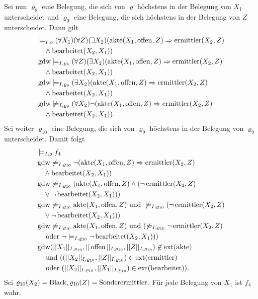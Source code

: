 \documentclass[12pt,a4paper]{amsart}
\begin{document}
Sei nun $\varrho_8$ eine Belegung, die sich von $\varrho$ höchstens in der Belegung von $X_1$ unterscheidet und $\varrho_9$ eine Belegung, die sich höchstens
in der Belegung von $Z$ unterscheidet. Dann gilt
\begin{align*}
&\models_{I,\varrho} (\forall X_1)(\forall Z)(\exists X_2)(\operatorname{akte}(X_1,\operatorname{offen},Z)\Rightarrow\operatorname{ermittler}(X_2,Z)\\
&\quad \land\operatorname{bearbeitet}(X_2,X_1)) \\
&\operatorname{gdw} \models_{I,\varrho_8} (\forall Z)(\exists X_2)(\operatorname{akte}(X_1,\operatorname{offen},Z)\Rightarrow\operatorname{ermittler}(X_2,Z)\\
&\quad\land\operatorname{bearbeitet}(X_2,X_1)) \\
&\operatorname{gdw} \models_{I,\varrho_9} (\exists X_2)(\operatorname{akte}(X_1,\operatorname{offen},Z)\Rightarrow\operatorname{ermittler}(X_2,Z)\\
&\quad\land\operatorname{bearbeitet}(X_2,X_1)) \\
&\operatorname{gdw} \not \models_{I,\varrho_9} (\forall X_2)\lnot (\operatorname{akte}(X_1,\operatorname{offen},Z)\Rightarrow\operatorname{ermittler}(X_2,Z)\\
&\quad\land\operatorname{bearbeitet}(X_2,X_1)).
\end{align*}
Sei weiter $\varrho_{10}$ eine Belegung, die sich von $\varrho_9$ höchstens in der Belegung von $\varrho_9$ unterscheidet. Damit folgt
\begin{align*}
&\models_{I,\varrho} f_4\\
&\operatorname{gdw} \not \models_{I,\varrho_{10}} \lnot (\operatorname{akte}(X_1,\operatorname{offen},Z)\Rightarrow\operatorname{ermittler}(X_2,Z)\\
&\quad\land\operatorname{bearbeitet}(X_2,X_1))\\
&\operatorname{gdw} \not \models_{I,\varrho_{10}} (\operatorname{akte}(X_1,\operatorname{offen},Z)\land(\lnot \operatorname{ermittler}(X_2,Z)\\
&\quad\lor\lnot\operatorname{bearbeitet}(X_2,X_1)))\\
&\operatorname{gdw} \not \models_{I,\varrho_{10}} \operatorname{akte}(X_1,\operatorname{offen},Z)\mbox{ und }\not \models_{I,\varrho_{10}}(\lnot \operatorname{ermittler}(X_2,Z)\\
&\quad\lor\lnot\operatorname{bearbeitet}(X_2,X_1)))\\
&\operatorname{gdw} \not \models_{I,\varrho_{10}} \operatorname{akte}(X_1,\operatorname{offen},Z)\mbox{ und }(\not \models_{I,\varrho_{10}}\lnot \operatorname{ermittler}(X_2,Z)\\
&\quad\mbox{ oder }\lnot \models_{I,\varrho_{10}}\lnot\operatorname{bearbeitet}(X_2,X_1)))\\
&\operatorname{gdw} (||X_1||_{I,\varrho_{10}},||\operatorname{offen}||_{I,\varrho_{10}},||Z||_{I,\varrho_{10}})\not\in\operatorname{ext}(\operatorname{akte})\\
&\quad\mbox{ und }
( (||X_2||_{I,\varrho_{10}},||Z||_{I,\varrho_{10}})\in\operatorname{ext}(\operatorname{ermittler})\\
&\quad\mbox{ oder } (||X_2||_{I,\varrho_{10}},||X_1||_{I,\varrho_{10}})\in\operatorname{ext}(\operatorname{bearbeitet}) ).
\end{align*}
Sei $\varrho_{10}(X_2)=\operatorname{Black},\varrho_{10}(Z)=\operatorname{Sonderermittler}$. Für jede Belegung von $X_1$ ist $f_4$ wahr.
\end{document}
